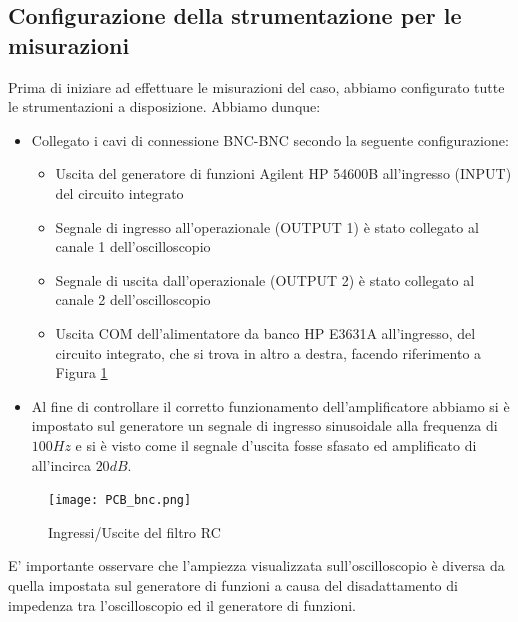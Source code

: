 \subsection{Configurazione della strumentazione per le misurazioni}
Prima di iniziare ad effettuare le misurazioni del caso, abbiamo configurato tutte le strumentazioni a disposizione. Abbiamo dunque:
\begin{itemize}
    \item Collegato i cavi di connessione BNC-BNC secondo la seguente configurazione:
    \begin{itemize}
        \item Uscita del generatore di funzioni Agilent HP 54600B all'ingresso (INPUT) del circuito integrato
        \item  Segnale di ingresso all'operazionale (OUTPUT 1) è stato collegato al canale 1 dell'oscilloscopio
        \item  Segnale di uscita dall'operazionale (OUTPUT 2) è stato collegato al canale 2 dell'oscilloscopio
        \item Uscita COM dell'alimentatore da banco HP E3631A all'ingresso, del circuito integrato, che si trova in altro a destra, facendo riferimento a Figura \ref{fig:pcb_bnc}
    \end{itemize}
    \item Al fine di controllare il corretto funzionamento dell'amplificatore abbiamo si è impostato sul generatore un segnale di ingresso sinusoidale alla frequenza di $100Hz$ e si è visto come il segnale d'uscita fosse sfasato ed amplificato di all'incirca $20dB$.  
\end{itemize}
\begin{figure}[h]
        \centering
        \texttt{[image: PCB\_bnc.png]}
        \caption{Ingressi/Uscite del filtro RC}
        \label{fig:pcb_bnc}
    \end{figure}
\FloatBarrier
E' importante osservare che l'ampiezza visualizzata sull'oscilloscopio è diversa da quella impostata sul generatore di funzioni a causa del disadattamento di impedenza tra l'oscilloscopio ed il generatore di funzioni.
